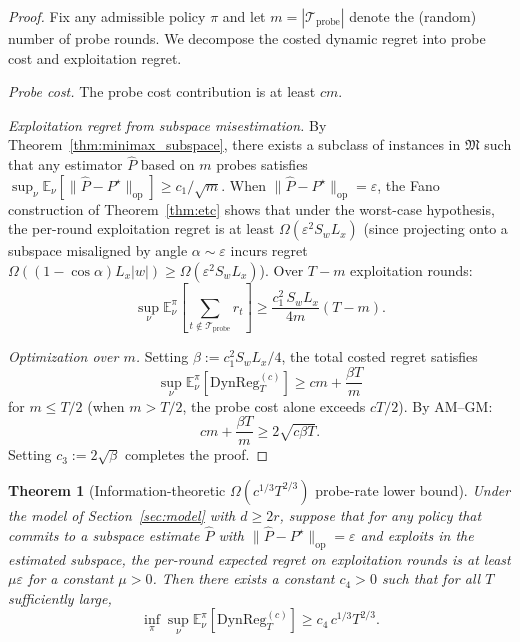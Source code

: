 \documentclass[12pt]{article}
\newcommand{\E}{\mathbb{E}}
\newcommand{\op}{\mathrm{op}}
\newcommand{\cTprobe}{\mathcal{T}_{\mathrm{probe}}}
\newcommand{\DynReg}{\mathrm{DynReg}}
\newtheorem{theorem}{Theorem}
\theoremstyle{plain}
\theoremstyle{definition}
\begin{document}
\begin{proof}
Fix any admissible policy $\pi$ and let $m = |\cTprobe|$ denote the (random) number of probe rounds. We decompose the costed dynamic regret into probe cost and exploitation regret.

\emph{Probe cost.}
The probe cost contribution is at least $cm$.

\emph{Exploitation regret from subspace misestimation.}
By Theorem~\ref{thm:minimax_subspace}, there exists a subclass of instances in $\mathfrak{M}$ such that any estimator $\widehat{P}$ based on $m$ probes satisfies $\sup_\nu \E_\nu[\|\widehat{P} - P^\star\|_{\op}] \ge c_1/\sqrt{m}$.
When $\|\widehat{P} - P^\star\|_{\op} = \varepsilon$, the Fano construction of Theorem~\ref{thm:etc} shows that under the worst-case hypothesis, the per-round exploitation regret is at least $\Omega(\varepsilon^2 S_w L_x)$ (since projecting onto a subspace misaligned by angle $\alpha \sim \varepsilon$ incurs regret $\Omega((1-\cos\alpha) L_x |w|) \ge \Omega(\varepsilon^2 S_w L_x)$). Over $T - m$ exploitation rounds:
\[
\sup_\nu \E_\nu^\pi\!\left[\sum_{t \notin \cTprobe} r_t\right]
\ge \frac{c_1^2\, S_w L_x}{4m} (T - m).
\]

\emph{Optimization over $m$.}
Setting $\beta := c_1^2 S_w L_x / 4$, the total costed regret satisfies
\[
\sup_\nu \E_\nu^\pi[\DynReg_T^{(c)}] \ge cm + \frac{\beta T}{m}
\]
for $m \le T/2$ (when $m > T/2$, the probe cost alone exceeds $cT/2$). By AM--GM:
\[
cm + \frac{\beta T}{m} \ge 2\sqrt{c\beta T}.
\]
Setting $c_3 := 2\sqrt{\beta}$ completes the proof.
\end{proof}

\begin{theorem}[Information-theoretic $\Omega(c^{1/3}T^{2/3})$ probe-rate lower bound]
\label{thm:probe_rate_lb}
Under the model of Section~\ref{sec:model} with $d \ge 2r$, suppose that for any policy that commits to a subspace estimate $\widehat{P}$ with $\|\widehat{P} - P^\star\|_{\op} = \varepsilon$ and exploits in the estimated subspace, the per-round expected regret on exploitation rounds is at least $\mu \varepsilon$ for a constant $\mu > 0$. Then there exists a constant $c_4 > 0$ such that for all $T$ sufficiently large,
\[
\inf_\pi \sup_\nu \E_\nu^\pi[\DynReg_T^{(c)}] \ge c_4\, c^{1/3} T^{2/3}.
\]
\end{theorem}
\end{document}
